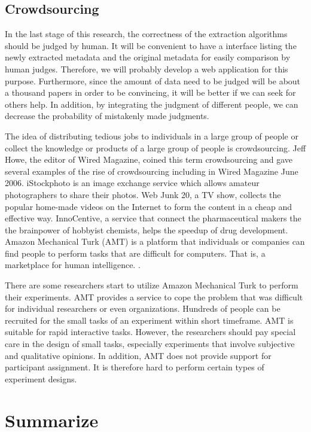 \documentclass[prodmode]{acmsmall} %
\begin{document}
\subsection{Crowdsourcing}

In the last stage of this research, the correctness of the extraction algorithms should be judged by human. It will be convenient to have a interface listing the newly extracted metadata and the original metadata for easily comparison by human judges. Therefore, we will probably develop a web application for this purpose. Furthermore, since the amount of data need to be judged will be about a thousand papers in order to be convincing, it will be better if we can seek for others help. In addition, by integrating the judgment of different people, we can decrease the probability of mistakenly made judgments.

The idea of distributing tedious jobs to individuals in a large group of people or collect the knowledge or products of a large group of people is crowdsourcing. Jeff Howe, the editor of Wired Magazine, coined this term crowdsourcing and gave several examples of the rise of crowdsourcing including in Wired Magazine June 2006. iStockphoto is an image exchange service which allows amateur photographers to share their photos. Web Junk 20, a TV show, collects the popular home-made videos on the Internet to form the content in a cheap and effective way. InnoCentive, a service that connect the pharmaceutical makers the the brainpower of hobbyist chemists, helps the speedup of drug development. Amazon Mechanical Turk (AMT) is a platform that individuals or companies can find people to perform tasks that are difficult for computers. That is, a marketplace for human intelligence. \cite{howe2006rise}.

There are some researchers start to utilize Amazon Mechanical Turk to perform their experiments. AMT provides a service to cope the problem that was difficult for individual researchers or even organizations. Hundreds of people can be recruited for the small tasks of an experiment within short timeframe. AMT is suitable for rapid interactive tasks. However, the researchers should pay special care in the design of small tasks, especially experiments that involve subjective and qualitative opinions. In addition, AMT does not provide support for participant assignment. It is therefore hard to perform certain types of experiment designs. \cite{kittur2008crowdsourcing}

\section{Summarize}





\end{document}
